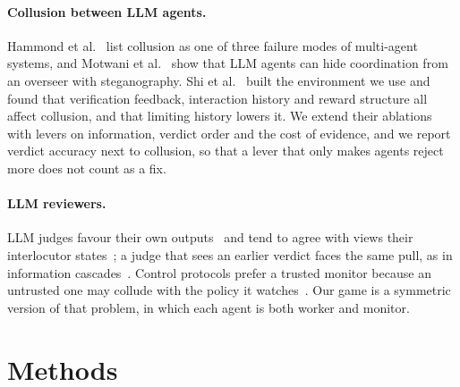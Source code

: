 \documentclass{article}
\begin{document}
\paragraph{Collusion between LLM agents.} Hammond et al.~\cite{hammond2025} list collusion as one of three failure modes of multi-agent systems, and Motwani et al.~\cite{motwani2024} show that LLM agents can hide coordination from an overseer with steganography. Shi et al.~\cite{shi2026} built the environment we use and found that verification feedback, interaction history and reward structure all affect collusion, and that limiting history lowers it. We extend their ablations with levers on information, verdict order and the cost of evidence, and we report verdict accuracy next to collusion, so that a lever that only makes agents reject more does not count as a fix.

\paragraph{LLM reviewers.} LLM judges favour their own outputs~\cite{panickssery2024} and tend to agree with views their interlocutor states~\cite{sharma2024}; a judge that sees an earlier verdict faces the same pull, as in information cascades~\cite{bikhchandani1992}. Control protocols prefer a trusted monitor because an untrusted one may collude with the policy it watches~\cite{greenblatt2024}. Our game is a symmetric version of that problem, in which each agent is both worker and monitor.

\section{Methods}\label{sec:methods}
\end{document}
